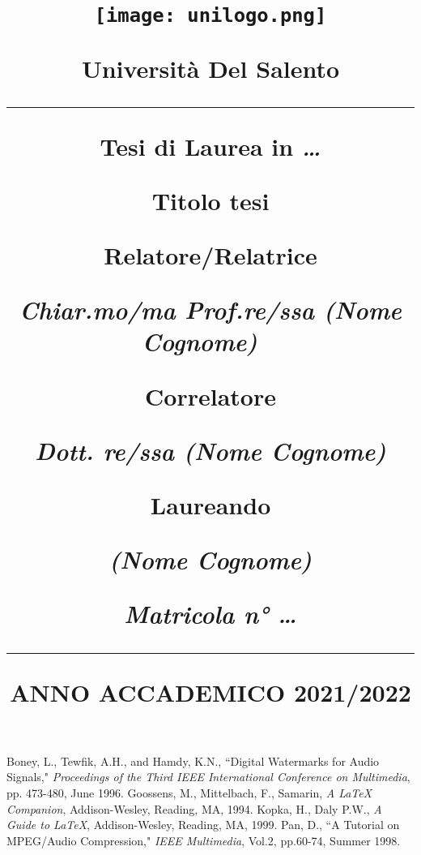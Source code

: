 \documentclass[a4paper, 12pt, notitlepage]{report}
\title{
    \texttt{[image: unilogo.png]}
    
    \vspace{1cm}
    {\Huge{\textbf{Università Del Salento}}}
    
    \normalfont{Corso di Laurea (Magistrale/Triennale) in
    
    (Nome CdL)}
    \par\noindent\rule{\textwidth}{0.4pt}
    
    \vspace{0.3cm}
    
    \par \large{Tesi di Laurea in \emph{\ldots}}
    
    \vspace{0.3cm}

    \par \Large{\textbf{Titolo tesi}}
    
    \vspace{6.0cm}

    \begin{minipage}{\textwidth}
        \par \small{Relatore/Relatrice} 
        \par \emph{Chiar.mo/ma Prof.re/ssa (Nome Cognome)}
        \ \newline
        \par \small{Correlatore}
        \par \emph{Dott. re/ssa (Nome Cognome)}
    \end{minipage}

    \par \hfill \small{Laureando 
    \par \hfill \emph{(Nome Cognome)}
    \par \hfill \emph{Matricola n° \ldots}}
    \par\noindent\rule{\textwidth}{0.4pt}
    \vspace{0.3cm}
    
    \small{ANNO ACCADEMICO 2021/2022}
    \thispagestyle{empty}
    }
\author{} %
\date{}   %
\begin{document}
    \maketitle

    \mbox{}
    \thispagestyle{empty}
    
    \hypersetup{hidelinks}
    \tableofcontents
    \thispagestyle{empty}

    \hypersetup{hidelinks}
    


    \hypersetup{hidelinks}
    
    
    \hypersetup{hidelinks}
    
    
    \hypersetup{hidelinks}
    
    
    \hypersetup{hidelinks}
    
    
    \hypersetup{hidelinks}
    

    \newpage
    \listoffigures
    
    \newpage
    \listoftables
    
    \begin{thebibliography}{100} %
         Boney, L., Tewfik, A.H., and Hamdy, K.N., ``Digital Watermarks for Audio Signals," \emph{Proceedings of the Third IEEE International Conference on Multimedia}, pp. 473-480, June 1996.
         Goossens, M., Mittelbach, F., Samarin, \emph{A LaTeX Companion}, Addison-Wesley, Reading, MA, 1994.
         Kopka, H., Daly P.W., \emph{A Guide to LaTeX}, Addison-Wesley, Reading, MA, 1999.
         Pan, D., ``A Tutorial on MPEG/Audio Compression," \emph{IEEE Multimedia}, Vol.2, pp.60-74, Summer 1998.
    \end{thebibliography}
\end{document}
